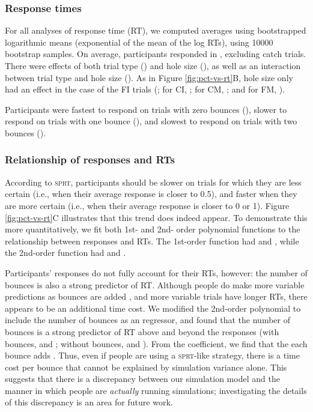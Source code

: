 \documentclass[10pt,letterpaper]{article}
\begin{document}
\subsubsection{Response times}

For all analyses of response time (RT), we computed averages using bootstrapped logarithmic means (exponential of the mean of the log RTs), using 10000 bootstrap samples.
On average, participants responded in \AvgRT{}, excluding catch trials.
There were effects of both trial type (\RTHoleClass{}) and hole size (\RTHoleSize{}), as well as an interaction between trial type and hole size (\RTFull{}).
As in Figure \ref{fig:pct-vs-rt}B, hole size only had an effect in the case of the FI trials (\ResponsetimeFIttest{}; for CI, \ResponsetimeCIttest{}; for CM, \ResponsetimeCMttest{}; and for FM, \ResponsetimeFMttest{}).

Participants were fastest to respond on trials with zero bounces (\RTZeroBounces{}), slower to respond on trials with one bounce (\RTOneBounces{}), and slowest to respond on trials with two bounces (\RTTwoBounces{}).

\subsubsection{Relationship of responses and RTs}

According to \textsc{sprt}, participants should be slower on trials for which they are less certain (i.e., when their average response is closer to 0.5), and faster when they are more certain (i.e., when their average response is closer to 0 or 1).
Figure \ref{fig:pct-vs-rt}C illustrates that this trend does indeed appear.
To demonstrate this more quantitatively, we fit both 1st- and 2nd- order polynomial functions to the relationship between responses and RTs.
The 1st-order function had \AicFirstOrder{} and \BicFirstOrder{}, while the 2nd-order function had \AicSecondOrder{} and \BicSecondOrder{}.

Participants' responses do not fully account for their RTs, however: the number of bounces is also a strong predictor of RT.
Although people do make more variable predictions as bounces are added \cite{Smith:2013fc}, and more variable trials have longer RTs, there appears to be an additional time cost.
We modified the 2nd-order polynomial to include the number of bounces as an regressor, and found that the number of bounces is a strong predictor of RT above and beyond the responses (with bounces, \AicSecondOrderWithBounces{} and \BicSecondOrderWithBounces{}; without bounces, \AicSecondOrder{} and \BicSecondOrder{}).
From the coefficient, we find that the each bounce adds \RTBounceCoef{}.
Thus, even if people are using a \textsc{sprt}-like strategy, there is a time cost per bounce that cannot be explained by simulation variance alone.
This suggests that there is a discrepancy between our simulation model and the manner in which people are \emph{actually} running simulations; investigating the details of this discrepancy is an area for future work.
\end{document}
